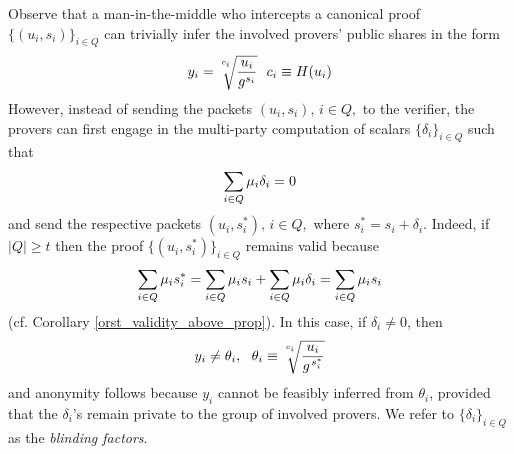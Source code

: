 \documentclass[10pt, psamsfonts, reqno]{amsart}
\theoremstyle{definition}
\theoremstyle{remark}
\numberwithin{equation}{section}
\begin{document}
Observe that a man-in-the-middle who intercepts a canonical proof
$\{(u_i, s_i)\}_{i \in Q}$ can trivially
infer the involved provers' public shares in the form
\vspace{5pt}
\begin{equation}\label{orst_leaked_public}
y_i =
\sqrt[\leftroot{0}\uproot{10}c_i]{\frac{u_i}{g ^ {s_i}}}
\ \ c_i \equiv H(u_i)
\vspace{5pt}
\end{equation}
\noindent
However, instead of sending the packets
$(u_i, s_i),\hspace{2pt} i \in Q,$ to the verifier,
the provers can first engage in the multi-party computation
of scalars $\{\delta_i\}_{i \in Q}$ such that
\vspace{5pt}
\begin{equation}\label{orst_deviations}
\sum_{i \in Q} \mu_i \delta_i = 0
\vspace{5pt}
\end{equation}
and send the respective packets $(u_i, s_i^*),\hspace{2pt} i \in Q,$
where $s_i^* = s_i + \delta_i$.
Indeed, if $|Q| \ge t$
then the proof $\{(u_i, s_i^*)\}_{i \in Q}$ remains valid because
\vspace{5pt}
\begin{equation*}
\sum_{i \in Q} \mu_i s_i^* =
\sum_{i \in Q} \mu_i s_i + \sum_{i \in Q} \mu_i \delta_i = 
\sum_{i \in Q} \mu_i s_i
\vspace{5pt}
\end{equation*}
\noindent
(cf. Corollary \ref{orst_validity_above_prop}).
In this case, if $\delta_i \neq 0$, then
\vspace{5pt}
\begin{equation*}\label{orst_thetas}
y_i \neq \theta_i,
\ \ \theta_i \equiv
\sqrt[\leftroot{0}\uproot{10}c_i]{\frac{u_i}{g ^ {\hspace{1pt}s_i^*}}}
\vspace{5pt}
\end{equation*}
and anonymity follows because $y_i$
cannot be feasibly inferred from $\theta_i$,
provided that the $\delta_i$'s
remain private to the group of involved provers.
We refer to $\{\delta_i\}_{i \in Q}$
as the \textit{blinding factors}.
\end{document}

